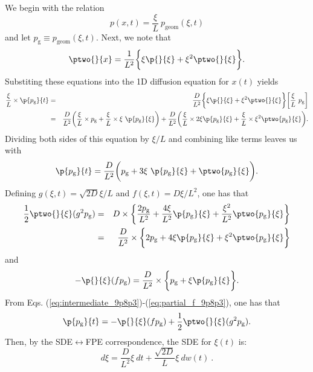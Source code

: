 We begin with the relation
\begin{equation}
p(x, t) = \frac{\xi}{L} ~ p_\text{geom}(\xi, t)
\end{equation}
and let $p_\text{g} \equiv p_\text{geom}(\xi, t)$. Next, we note that
\begin{equation}
\ptwo{}{x} = \frac{1}{L^2} \bigg\{\xi \p{}{\xi} + \xi^2 \ptwo{}{\xi} \bigg\}.
\end{equation}
Substiting these equations into the 1D diffusion equation for $x(t)$ yields
\begin{eqnarray}
\frac{\xi}{L} \times \p{p_\text{g}}{t} &=& \frac{D}{L^2}\bigg\{\xi \p{}{\xi} + \xi^2 \ptwo{}{\xi} \bigg\} \bigg[ \frac{\xi}{L} ~ p_\text{g} \bigg] \nonumber \\
&=& \frac{D}{L^2} \bigg(\frac{\xi}{L} \times p_\text{g} + \frac{\xi}{L} \times \xi~\p{p_\text{g}}{\xi}\bigg)
+ \frac{D}{L^2} \bigg(\frac{\xi}{L} \times 2\xi \p{p_\text{g}}{\xi} + \frac{\xi}{L} \times \xi^2 \ptwo{p_\text{g}}{\xi} \bigg) \nonumber.
\end{eqnarray}
Dividing both sides of this equation by $\xi/L$ and combining like terms leaves us with
\begin{equation}
\p{p_\text{g}}{t} = \frac{D}{L^2} \bigg(p_\text{g} + 3 \xi~\p{p_\text{g}}{\xi} + \ptwo{p_\text{g}}{\xi} \bigg). \label{eq:intermediate_9p8p3}
\end{equation}
Defining $g(\xi, t) = \sqrt{2D} \xi / L$ and $f(\xi, t) = D\xi/L^2$, one has that
\begin{eqnarray}
\frac{1}{2} \ptwo{}{\xi}(g^2 p_\text{g}) &=& D \times \bigg\{\frac{2 p_\text{g}}{L^2} + \frac{4 \xi}{L^2} \p{p_\text{g}}{\xi} + \frac{\xi^2}{L^2} \ptwo{p_\text{g}}{\xi}\bigg\} \nonumber \\ 
&=& \frac{D}{L^2} \times \bigg\{2 p_\text{g} + 4 \xi \p{p_\text{g}}{\xi} + \xi^2 \ptwo{p_\text{g}}{\xi}\bigg\} \label{eq:partial_g_9p8p3}
\end{eqnarray}
and
\begin{equation}
-\p{}{\xi}(f p_\text{g}) = \frac{D}{L^2} \times \bigg\{p_\text{g} + \xi \p{p_\text{g}}{\xi} \bigg\}. \label{eq:partial_f_9p8p3}
\end{equation}
From Eqs. (\ref{eq:intermediate_9p8p3})-(\ref{eq:partial_f_9p8p3}), one has that
\begin{equation}
\p{p_\text{g}}{t} = -\p{}{\xi}(f p_\text{g}) + \frac{1}{2} \ptwo{}{\xi}(g^2 p_\text{g}).
\end{equation}
Then, by the SDE$\leftrightarrow$FPE correspondence, the SDE for $\xi(t)$ is:
\begin{equation}
\boxed{d \xi = \frac{D}{L^2} \xi ~ dt + \frac{\sqrt{2D}}{L} \xi~ dw(t)}~.
\end{equation}
